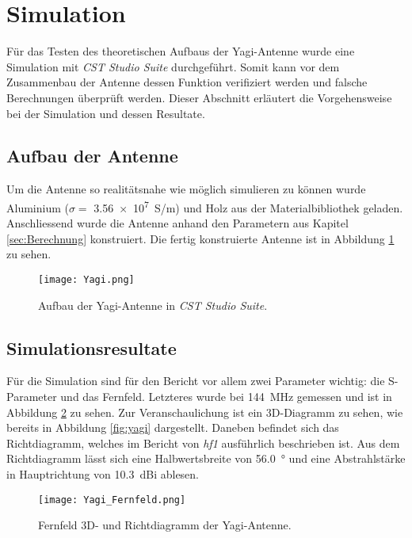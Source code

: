 \section{Simulation}\label{sec:Simulationsresultate}

Für das Testen des theoretischen Aufbaus der Yagi-Antenne wurde eine Simulation mit \textit{CST Studio Suite} durchgeführt. Somit kann vor dem Zusammenbau der Antenne dessen Funktion verifiziert werden und falsche Berechnungen überprüft werden. Dieser Abschnitt erläutert die Vorgehensweise bei der Simulation und dessen Resultate.

\subsection{Aufbau der Antenne}

Um die Antenne so realitätsnahe wie möglich simulieren zu können wurde Aluminium ($\sigma = $ \SI{3.56e+7}{S/m}) und Holz aus der Materialbibliothek geladen. Anschliessend wurde die Antenne anhand den Parametern aus Kapitel \ref{sec:Berechnung} konstruiert. Die fertig konstruierte Antenne ist in Abbildung \ref{fig:Simulation_Yagi} zu sehen.

\begin{figure}[h!]
	\centering
	\texttt{[image: Yagi.png]}
	\caption{Aufbau der Yagi-Antenne in \textit{CST Studio Suite}.}
	\label{fig:Simulation_Yagi}
\end{figure}

\subsection{Simulationsresultate}

Für die Simulation sind für den Bericht vor allem zwei Parameter wichtig: die S-Parameter und das Fernfeld. Letzteres wurde bei \SI{144}{MHz} gemessen und ist in Abbildung \ref{fig:Simulation_Yagi_Fernfeld} zu sehen. Zur Veranschaulichung ist ein 3D-Diagramm zu sehen, wie bereits in Abbildung \ref{fig:yagi} dargestellt. Daneben befindet sich das Richtdiagramm, welches im Bericht von \textit{hf1} ausführlich beschrieben ist. Aus dem Richtdiagramm lässt sich eine Halbwertsbreite von \SI{56.0}{\degree} und eine Abstrahlstärke in Hauptrichtung von \SI{10.3}{dBi} ablesen.

 \newpage

\begin{figure}[h!]
	\centering
	\texttt{[image: Yagi\_Fernfeld.png]}
	\caption{Fernfeld 3D- und Richtdiagramm der Yagi-Antenne.}
	\label{fig:Simulation_Yagi_Fernfeld}
\end{figure}

